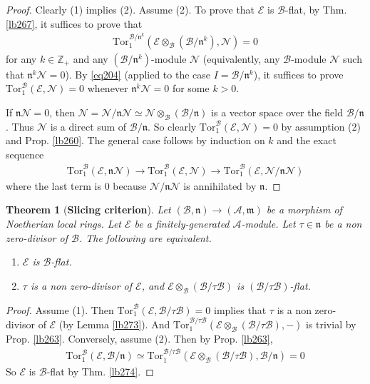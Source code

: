 \documentclass[12pt,b5paper,notitlepage]{report}
\theoremstyle{definition}
\theoremstyle{plain}
\newtheorem{thm}[df]{Theorem}
\newcommand{\fk}{\mathfrak}
\newcommand{\mc}{\mathcal}
\newcommand{\Zbb}{\mathbb Z}
\newcommand{\Tor}{\mathrm{Tor}}
\newcommand{\nk}{\mathfrak n}
\numberwithin{equation}{section}
\begin{document}
\begin{proof}
Clearly (1) implies (2). Assume (2). To prove that $\mc E$ is $\mc B$-flat, by Thm. \ref{lb267}, it suffices to prove that
\begin{align*}
\Tor_1^{\mc B/\nk^k}(\mc E\otimes_{\mc B}(\mc B/\nk^k),\mc N)=0
\end{align*}
for any $k\in\Zbb_+$ and any $(\mc B/\nk^k)$-module $\mc N$ (equivalently, any $\mc B$-module $\mc N$ such that $\nk^k\mc N=0$). By \eqref{eq204} (applied to the case $I=\mc B/\fk n^k$), it suffices to prove $\Tor_1^{\mc B}(\mc E,\mc N)=0$ whenever $\nk^k\mc N=0$ for some $k>0$.


If $\nk\mc N=0$, then $\mc N=\mc N/\fk n\mc N\simeq\mc N\otimes_{\mc B}(\mc B/\fk n)$ is a vector space over the field $\mc B/\fk n$. Thus $\mc N$ is a direct sum of $\mc B/\fk n$. So clearly $\Tor_1^{\mc B}(\mc E,\mc N)=0$ by assumption (2) and Prop. \ref{lb260}. The general case follows by induction on $k$ and the exact sequence
\begin{align*}
\Tor_1^{\mc B}(\mc E,\nk\mc N)\rightarrow \Tor_1^{\mc B}(\mc E,\mc N)\rightarrow\Tor_1^{\mc B}(\mc E,\mc N/\nk\mc N)
\end{align*}
where the last term is $0$ because $\mc N/\nk\mc N$ is annihilated by $\nk$.
\end{proof}






\begin{thm}[\textbf{Slicing criterion}]\label{lb275}
Let $(\mc B,\fk n)\rightarrow(\mc A,\fk m)$ be a morphism of Noetherian local rings. Let $\mc E$ be a finitely-generated $\mc A$-module. Let $\tau\in\nk$ be a non zero-divisor of $\mc B$. The following are equivalent.
\begin{enumerate}[label=(\arabic*)]
\item $\mc E$ is $\mc B$-flat.
\item $\tau$ is a non zero-divisor of $\mc E$, and $\mc E\otimes_{\mc B}(\mc B/\tau\mc B)$ is $(\mc B/\tau\mc B)$-flat.
\end{enumerate}
\end{thm}


\begin{proof}
Assume (1). Then $\Tor_1^{\mc B}(\mc E,\mc B/\tau\mc B)=0$ implies that $\tau$ is a non zero-divisor of $\mc E$ (by Lemma \ref{lb273}). And $\Tor_1^{\mc B/\tau\mc B}(\mc E\otimes_{\mc B}(\mc B/\tau\mc B),-)$ is trivial by Prop. \ref{lb263}. Conversely, assume (2). Then by Prop. \ref{lb263},
\begin{align*}
\Tor_1^{\mc B}(\mc E,\mc B/\nk)\simeq\Tor_1^{\mc B/\tau\mc B}(\mc E\otimes_{\mc B}(\mc B/\tau\mc B),\mc B/\nk)=0
\end{align*}
So $\mc E$ is $\mc B$-flat by Thm. \ref{lb274}.
\end{proof}
\end{document}
